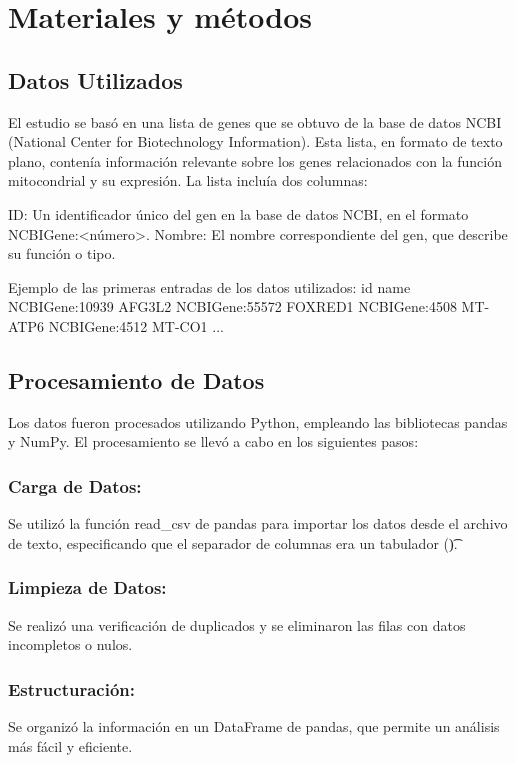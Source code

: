 \section{Materiales y métodos}


\subsection{Datos Utilizados}

El estudio se basó en una lista de genes que se obtuvo de la base de datos NCBI (National Center for Biotechnology Information). Esta lista, en formato de texto plano, contenía información relevante sobre los genes relacionados con la función mitocondrial y su expresión. La lista incluía dos columnas:

ID: Un identificador único del gen en la base de datos NCBI, en el formato NCBIGene:<número>.
Nombre: El nombre correspondiente del gen, que describe su función o tipo.

Ejemplo de las primeras entradas de los datos utilizados:
id                  name
NCBIGene:10939      AFG3L2
NCBIGene:55572      FOXRED1
NCBIGene:4508       MT-ATP6
NCBIGene:4512       MT-CO1
...


\subsection{Procesamiento de Datos}

Los datos fueron procesados utilizando Python, empleando las bibliotecas pandas y NumPy. El procesamiento se llevó a cabo en los siguientes pasos:

\subsubsection{Carga  de Datos:} Se utilizó la función read_csv de pandas para importar los datos desde el archivo de texto, especificando que el separador de columnas era un tabulador (\t).

\subsubsection{Limpieza de Datos:} Se realizó una verificación de duplicados y se eliminaron las filas con datos incompletos o nulos.

\subsubsection{Estructuración: } Se organizó la información en un DataFrame de pandas, que permite un análisis más fácil y eficiente.






